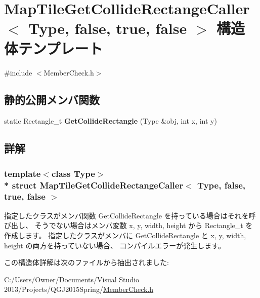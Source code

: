 \hypertarget{struct_map_tile_get_collide_rectange_caller_3_01_type_00_01false_00_01true_00_01false_01_4}{}\section{Map\+Tile\+Get\+Collide\+Rectange\+Caller$<$ Type, false, true, false $>$ 構造体テンプレート}
\label{struct_map_tile_get_collide_rectange_caller_3_01_type_00_01false_00_01true_00_01false_01_4}


 




{\ttfamily \#include $<$Member\+Check.\+h$>$}

\subsection*{静的公開メンバ関数}
\begin{DoxyCompactItemize}
\item 
static Rectangle\+\_\+t {\bfseries Get\+Collide\+Rectangle} (Type \&obj, int x, int y)\hypertarget{struct_map_tile_get_collide_rectange_caller_3_01_type_00_01false_00_01true_00_01false_01_4_a52e7a759a2c5faa819be54dafde11352}{}\label{struct_map_tile_get_collide_rectange_caller_3_01_type_00_01false_00_01true_00_01false_01_4_a52e7a759a2c5faa819be54dafde11352}

\end{DoxyCompactItemize}


\subsection{詳解}
\subsubsection*{template$<$class Type$>$\\*
struct Map\+Tile\+Get\+Collide\+Rectange\+Caller$<$ Type, false, true, false $>$}



指定したクラスがメンバ関数 Get\+Collide\+Rectangle を持っている場合はそれを呼び出し、 そうでない場合はメンバ変数 x, y, width, height から Rectangle\+\_\+t を作成します。 指定したクラスがメンバに Get\+Collide\+Rectangle と x, y, width, height の両方を持っていない場合、 コンパイルエラーが発生します。 

この構造体詳解は次のファイルから抽出されました\+:\begin{DoxyCompactItemize}
\item 
C\+:/\+Users/\+Owner/\+Documents/\+Visual Studio 2013/\+Projects/\+Q\+G\+J2015\+Spring/\hyperlink{_member_check_8h}{Member\+Check.\+h}\end{DoxyCompactItemize}
